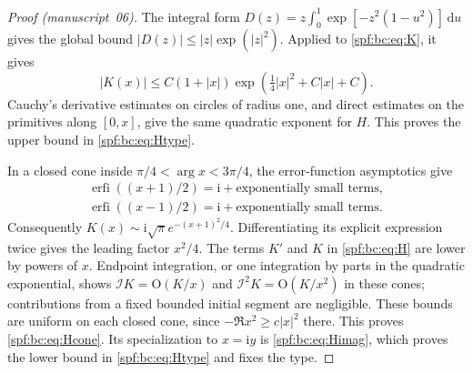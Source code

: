 \documentclass[11pt]{article}
\numberwithin{equation}{section}
\theoremstyle{definition}
\theoremstyle{remark}
\theoremstyle{definition}
\newcommand{\bigO}{\mathrm O}
\newcommand{\bcI}{\mathcal I}
\begin{document}
\begin{proof}[Proof (manuscript~06)]
The integral form
$D(z)=z\int_0^1\exp[-z^2(1-u^2)]\,\mathrm d u$ gives the global bound
$|D(z)|\le |z|\exp(|z|^2)$. Applied to \eqref{spf:bc:eq:K}, it gives
\[
 |K(x)|\le C(1+|x|)\exp\!\left(\tfrac14|x|^2+C|x|+C\right).
\]
Cauchy's derivative estimates on circles of radius one, and direct estimates
on the primitives along $[0,x]$, give the same quadratic exponent for $H$.
This proves the upper bound in \eqref{spf:bc:eq:Htype}.

In a closed cone inside $\pi/4<\arg x<3\pi/4$, the error-function asymptotics
\cite{bcDlmfErf} give
\begin{gather*}
 \operatorname{erfi}((x+1)/2)=\mathrm i+\text{exponentially small terms},\\
 \operatorname{erfi}((x-1)/2)=\mathrm i+\text{exponentially small terms}.
\end{gather*}
Consequently $K(x)\sim\mathrm i\sqrt\pi e^{-(x+1)^2/4}$. Differentiating its
explicit expression twice gives the leading factor $x^2/4$. The terms $K'$
and $K$ in \eqref{spf:bc:eq:H} are lower by powers of $x$. Endpoint integration,
or one integration by parts in the quadratic exponential, shows
$\bcI K=\bigO(K/x)$ and $\bcI^2K=\bigO(K/x^2)$ in these cones; contributions
from a fixed bounded initial segment are negligible. These bounds are uniform
on each closed cone, since $-\Re x^2\ge c|x|^2$ there. This proves
\eqref{spf:bc:eq:Hcone}. Its specialization to $x=\mathrm i y$ is \eqref{spf:bc:eq:Himag},
which proves the lower bound in \eqref{spf:bc:eq:Htype} and fixes the type.
\end{proof}
\end{document}
